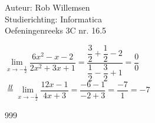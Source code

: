 \documentclass[a4paper]{article}
\newcommand{\limit}{\lim\limits}
\begin{document}
\noindent \large Auteur: Rob Willemsen \\
\noindent \large Studierichting: Informatica \\
\noindent \large Oefeningenreeks 3C nr. 16.5 \\

\medskip

\normalsize

$\limit_{x \rightarrow -\tfrac{1}{2}} \dfrac{6x^2-x-2}{2x^2+3x+1} = \dfrac{\dfrac{3}{2} + \dfrac{1}{2}-2}{\dfrac{1}{2}-\dfrac{3}{2}+1} = \dfrac{0}{0}$\\

$\overset{H}{=}\limit_{x \rightarrow -\tfrac{1}{2}} \dfrac{12x - 1}{4x + 3} = \dfrac{-6-1}{-2+3} = \dfrac{-7}{1} = -7$\\

\begin{thebibliography}{999}
\end{thebibliography}
\end{document}
